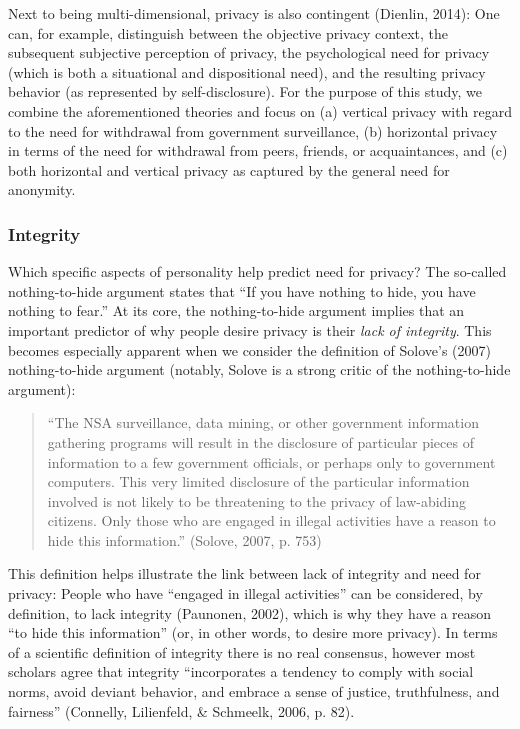 \documentclass[man,floatsintext]{apa6}
\theoremstyle{definition}
\theoremstyle{definition}
\theoremstyle{definition}
\theoremstyle{remark}
\begin{document}
Next to being multi-dimensional, privacy is also contingent (Dienlin,
2014): One can, for example, distinguish between the objective privacy
context, the subsequent subjective perception of privacy, the
psychological need for privacy (which is both a situational and
dispositional need), and the resulting privacy behavior (as represented
by self-disclosure). For the purpose of this study, we combine the
aforementioned theories and focus on (a) vertical privacy with regard to
the need for withdrawal from government surveillance, (b) horizontal
privacy in terms of the need for withdrawal from peers, friends, or
acquaintances, and (c) both horizontal and vertical privacy as captured
by the general need for anonymity.

\hypertarget{integrity}{%
\subsubsection{Integrity}\label{integrity}}

Which specific aspects of personality help predict need for privacy? The
so-called nothing-to-hide argument states that \enquote{If you have
nothing to hide, you have nothing to fear.} At its core, the
nothing-to-hide argument implies that an important predictor of why
people desire privacy is their \emph{lack of integrity}. This becomes
especially apparent when we consider the definition of Solove's (2007)
nothing-to-hide argument (notably, Solove is a strong critic of the
nothing-to-hide argument):

\begin{quote}
\enquote{The NSA surveillance, data mining, or other government
information gathering programs will result in the disclosure of
particular pieces of information to a few government officials, or
perhaps only to government computers. This very limited disclosure of
the particular information involved is not likely to be threatening to
the privacy of law-abiding citizens. Only those who are engaged in
illegal activities have a reason to hide this information.} (Solove,
2007, p. 753)
\end{quote}

This definition helps illustrate the link between lack of integrity and
need for privacy: People who have \enquote{engaged in illegal
activities} can be considered, by definition, to lack integrity
(Paunonen, 2002), which is why they have a reason \enquote{to hide this
information} (or, in other words, to desire more privacy). In terms of a
scientific definition of integrity there is no real consensus, however
most scholars agree that integrity \enquote{incorporates a tendency to
comply with social norms, avoid deviant behavior, and embrace a sense of
justice, truthfulness, and fairness} (Connelly, Lilienfeld, \& Schmeelk,
2006, p. 82).
\end{document}
